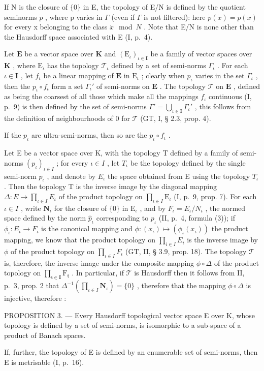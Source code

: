If N is the closure of \(\{0\}\) in E, the topology of E/N is defined by the quotient seminorms \(\dot{p}\) , where p varies in \(\Gamma\) (even if \(\Gamma\) is not filtered): here \(\dot{p}(\dot{x}) = p(x)\) for every x belonging to the class \(\dot{x} \mod N\) . Note that E/N is none other than the Hausdorff space associated with E (I, p.~4).

Let \(\mathbf{E}\) be a vector space over \(\mathbf{K}\) and \((\mathrm{E}_{\iota})_{\iota \in \mathbf{I}}\) be a family of vector spaces over \(\mathbf{K}\) , where \(\mathrm{E}_{\iota}\) has the topology \(\mathcal{T}_{\iota}\) defined by a set of semi-norms \(\Gamma_{\iota}\) . For each \(\iota \in \mathbf{I}\) , let \(f_{\iota}\) be a linear mapping of \(\mathbf{E}\) in \(\mathrm{E}_{\iota}\) ; clearly when \(p_{\iota}\) varies in the set \(\Gamma_{\iota}\) , then the \(p_{\iota} \circ f_{\iota}\) form a set \(\Gamma_{\iota}'\) of semi-norms on \(\mathbf{E}\) . The topology \(\mathcal{T}\) on \(\mathbf{E}\) , defined as being the coarsest of all those which make all the mappings \(f_{\iota}\) continuous (I, p.~9) is then defined by the set of semi-norms \(\Gamma' = \bigcup_{\iota \in \mathbf{I}} \Gamma_{\iota}'\) , this follows from the definition of neighbourhoods of 0 for \(\mathcal{T}\) (GT, I, § 2.3, prop. 4).

If the \(p_{\iota}\) are ultra-semi-norms, then so are the \(p_{\iota} \circ f_{\iota}\) .

Let E be a vector space over K, with the topology T defined by a family of semi-norms \((p_{\iota})_{\iota \in I}\) ; for every \(\iota \in I\) , let \(T_{\iota}\) be the topology defined by the single semi-norm \(p_{\iota}\) , and denote by \(E_{\iota}\) the space obtained from E using the topology \(T_{\iota}\) . Then the topology T is the inverse image by the diagonal mapping \(\Delta : E \to \prod_{\iota \in I} E_{\iota}\) of the product topology on \(\prod_{\iota \in I} \mathrm{E}_{\iota}\) (I, p.~9, prop. 7). For each \(\iota \in I\) , write \(\mathbf {N} _ {\iota}\) for the closure of \(\{0 \}\) in \(\mathrm{E} _ {\iota}\) , and by \(F_{\iota} = E_{\iota}/N_{\iota}\) , the normed space defined by the norm \(\hat{p}_{\iota}\) corresponding to \(p_{\iota}\) (II, p.~4, formula (3)); if \(\phi_{\iota}: E_{\iota} \to F_{\iota}\) is the canonical mapping and \(\phi : (x_{\iota}) \mapsto (\phi_{\iota}(x_{\iota}))\) the product mapping, we know that the product topology on \(\prod_{i \in I} E_{i}\) is the inverse image by \(\phi\) of the product topology on \(\prod_{\iota \in I}F_{\iota}\) (GT, II, § 3.9, prop. 18). The topology \(\mathcal{T}\) is, therefore, the inverse image under the composite mapping \(\phi \circ \Delta\) of the product topology on \(\prod_{\mathfrak{t}\in \mathbf{I}}\mathrm{F}_{\mathfrak{t}}\) . In particular, if \(\mathcal{T}\) is Hausdorff then it follows from II, p.~3, prop. 2 that \(\Delta^{-1}(\prod_{\iota \in I} \mathbf{N}_{\iota}) = \{0 \}\) , therefore that the mapping \(\phi \circ \Delta\) is injective, therefore :

PROPOSITION 3. --- Every Hausdorff topological vector space E over K, whose topology is defined by a set of semi-norms, is isomorphic to a sub-space of a product of Banach spaces.

If, further, the topology of E is defined by an enumerable set of semi-norms, then E is metrisable (I, p.~16).

